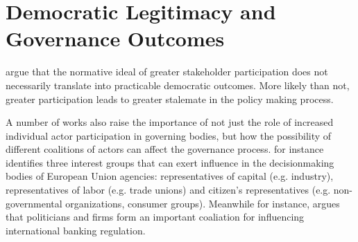 

\section{Democratic Legitimacy and Governance Outcomes}


\citet{agne_etal:2015} argue that the normative ideal of greater stakeholder participation does not necessarily translate into practicable democratic outcomes. More likely than not, greater participation leads to greater stalemate in the policy making process.


A number of works also raise the importance of not just the role of increased individual actor participation in governing bodies, but how the possibility of different coalitions of actors can affect the governance process. \citet{perezDuran:2018} for instance identifies three interest groups that can exert influence in the decisionmaking bodies of European Union agencies: representatives of capital (e.g. industry), representatives of labor (e.g. trade unions) and citizen's representatives (e.g. non-governmental organizations, consumer groups). Meanwhile \citet{goldbach:2015} for instance, argues that politicians and firms form an important coaliation for influencing international banking regulation.  







  








  

